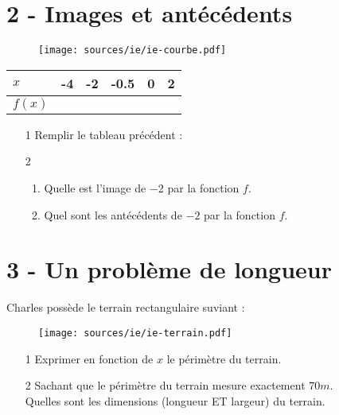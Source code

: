 \documentclass[11pt]{article}
\begin{document}
\noindent\hrulefill

\section*{2 - Images et antécédents}

\begin{multicols}{2}

  \begin{figure}[H]
    \centering
    \texttt{[image: sources/ie/ie-courbe.pdf]}
  \end{figure}

  \begin{center}
    \begin{tabular}{| l || c | c | c | c | c |}
      \hline			
      $x$    & -4 & -2 & -0.5 & 0 & 2\\
      \hline  
      $f(x)$ &    &    &      &   & \\
      \hline  
    \end{tabular}
  \end{center}


  \begin{enumerate}
  \item[1] Remplir le tableau précédent :
  \item[2] 
    \begin{enumerate}
    \item Quelle est l'image de $-2$ par la fonction $f$.
    \item Quel sont les antécédents de $-2$ par la fonction $f$.
    \end{enumerate}
  \end{enumerate}

\end{multicols}

\noindent\hrulefill

\section*{3 - Un problème de longueur }

\begin{multicols}{2}

  Charles possède le terrain rectangulaire suviant : 

  \begin{figure}[H]
    \centering
    \texttt{[image: sources/ie/ie-terrain.pdf]}
  \end{figure}
 
  \begin{enumerate}
  \item[1] Exprimer en fonction de $x$ le périmètre du terrain.
  \item[2]   Sachant que le périmètre du terrain mesure exactement $70m$.\\
  Quelles sont les dimensions (longueur ET largeur) du terrain.
  \end{enumerate}

\end{multicols}
\end{document}
